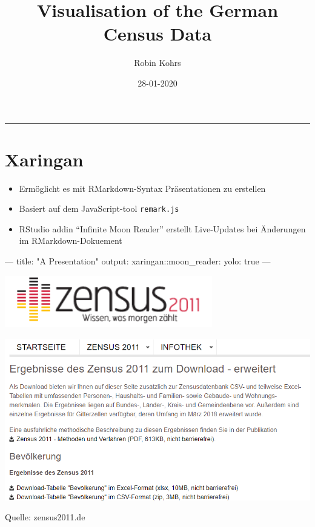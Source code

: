 \documentclass[]{tufte-handout}
\title{Visualisation of the German Census Data}
\author{Robin Kohrs}
\date{28-01-2020}
\newenvironment{Shaded}{}{}
\newcommand{\AttributeTok}[1]{\textcolor[rgb]{0.49,0.56,0.16}{#1}}
\newcommand{\CharTok}[1]{\textcolor[rgb]{0.25,0.44,0.63}{#1}}
\newcommand{\FunctionTok}[1]{\textcolor[rgb]{0.02,0.16,0.49}{#1}}
\newcommand{\NormalTok}[1]{#1}
\newcommand{\OtherTok}[1]{\textcolor[rgb]{0.00,0.44,0.13}{#1}}
\newcommand{\StringTok}[1]{\textcolor[rgb]{0.25,0.44,0.63}{#1}}
\providecommand{\tightlist}{%
  \setlength{\itemsep}{0pt}\setlength{\parskip}{0pt}}
\begin{document}
\maketitle




\begin{center}\rule{0.5\linewidth}{\linethickness}\end{center}

\hypertarget{xaringan}{%
\section{Xaringan}\label{xaringan}}

\begin{itemize}
\tightlist
\item
  Ermöglicht es mit RMarkdown-Syntax Präsentationen zu erstellen
\item
  Basiert auf dem JavaScript-tool \texttt{remark.js}
\item
  RStudio addin ``Infinite Moon Reader'' erstellt Live-Updates bei
  Änderungen im RMarkdown-Dokuement
\end{itemize}

\begin{Shaded}
\begin{Highlighting}[]
\OtherTok{---}
\FunctionTok{title:}\AttributeTok{ }\StringTok{"A  Presentation"}
\FunctionTok{output:}
\NormalTok{  xaringan:}\FunctionTok{:moon_reader:}
    \FunctionTok{yolo:}\AttributeTok{ }\CharTok{true}
\OtherTok{---}
\end{Highlighting}
\end{Shaded}

\begin{marginfigure}
\includegraphics[width=3.56in]{img/logo} \caption[ ]{ }\label{fig:unnamed-chunk-2}
\end{marginfigure}

\begin{marginfigure}
\includegraphics[width=11.1in]{img/ergebnisse} \caption[Quelle]{Quelle: zensus2011.de}\label{fig:unnamed-chunk-3}
\end{marginfigure}
\end{document}
